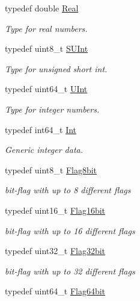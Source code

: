 \begin{DoxyCompactItemize}
\item 
typedef double \hyperlink{namespaceFVCode3D_a40c1f5588a248569d80aa5f867080e83}{Real}
\begin{DoxyCompactList}\small\item\em Type for real numbers. \end{DoxyCompactList}\item 
typedef uint8\+\_\+t \hyperlink{namespaceFVCode3D_a0319e74922d1d700fbc06e470e0cfc07}{S\+U\+Int}
\begin{DoxyCompactList}\small\item\em Type for unsigned short int. \end{DoxyCompactList}\item 
typedef uint64\+\_\+t \hyperlink{namespaceFVCode3D_a4bf7e328c75d0fd504050d040ebe9eda}{U\+Int}
\begin{DoxyCompactList}\small\item\em Type for integer numbers. \end{DoxyCompactList}\item 
typedef int64\+\_\+t \hyperlink{namespaceFVCode3D_a2263c42382b217732a2d4e1f7348120a}{Int}
\begin{DoxyCompactList}\small\item\em Generic integer data. \end{DoxyCompactList}\item 
typedef uint8\+\_\+t \hyperlink{namespaceFVCode3D_a4eac36ed1d93d886ecdcf46c6386b415}{Flag8bit}
\begin{DoxyCompactList}\small\item\em bit-\/flag with up to 8 different flags \end{DoxyCompactList}\item 
typedef uint16\+\_\+t \hyperlink{namespaceFVCode3D_a17a9cb86e2e25bbfbfcb645a2eec1d64}{Flag16bit}
\begin{DoxyCompactList}\small\item\em bit-\/flag with up to 16 different flags \end{DoxyCompactList}\item 
typedef uint32\+\_\+t \hyperlink{namespaceFVCode3D_a74d2aa7527dcbbec13101b55a3cb149d}{Flag32bit}
\begin{DoxyCompactList}\small\item\em bit-\/flag with up to 32 different flags \end{DoxyCompactList}\item 
typedef uint64\+\_\+t \hyperlink{namespaceFVCode3D_ab5f86a12f707861f59c32d022209bfb1}{Flag64bit}

\end{DoxyCompactItemize}
